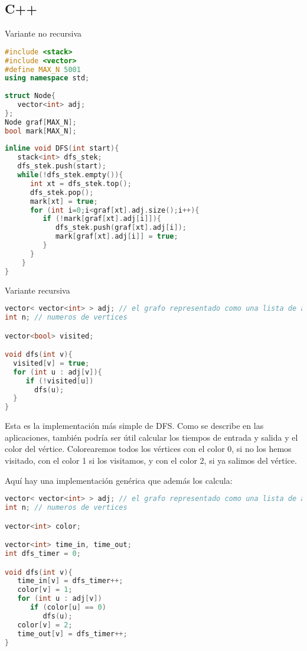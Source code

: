 \subsection{C++}

Variante no recursiva

\begin{lstlisting}[language=C++]
#include <stack>
#include <vector>
#define MAX_N 5001
using namespace std;
	
struct Node{
   vector<int> adj;
};
Node graf[MAX_N];
bool mark[MAX_N];
	
inline void DFS(int start){
   stack<int> dfs_stek;
   dfs_stek.push(start);
   while(!dfs_stek.empty()){
      int xt = dfs_stek.top();
	  dfs_stek.pop();
      mark[xt] = true;
      for (int i=0;i<graf[xt].adj.size();i++){
         if (!mark[graf[xt].adj[i]]){
            dfs_stek.push(graf[xt].adj[i]);
            mark[graf[xt].adj[i]] = true;
         }
      }
    }
}
\end{lstlisting} 

Variante recursiva

\begin{lstlisting}[language=C++]
vector< vector<int> > adj; // el grafo representado como una lista de adyacencia
int n; // numeros de vertices

vector<bool> visited;

void dfs(int v){
  visited[v] = true;
  for (int u : adj[v]){
     if (!visited[u])
       dfs(u);
  }
}
\end{lstlisting}

Esta es la implementación más simple de DFS. Como se describe en las aplicaciones, también podría ser útil calcular los tiempos de entrada y salida y el color del vértice. Colorearemos todos los vértices con el color 0, si no los hemos visitado, con el color 1 si los visitamos, y con el color 2, si ya salimos del vértice.

Aquí hay una implementación genérica que además los calcula:

\begin{lstlisting}[language=C++]
vector< vector<int> > adj; // el grafo representado como una lista de adyacencia
int n; // numeros de vertices

vector<int> color;

vector<int> time_in, time_out;
int dfs_timer = 0;

void dfs(int v){
   time_in[v] = dfs_timer++;
   color[v] = 1;
   for (int u : adj[v])
      if (color[u] == 0)
         dfs(u);
   color[v] = 2;
   time_out[v] = dfs_timer++;
}
\end{lstlisting}

